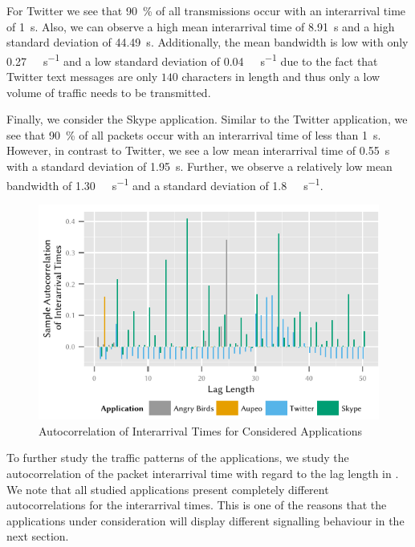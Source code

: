 For Twitter we see that \SI{90}{\percent} of all transmissions occur with an interarrival time of \SI{1}{\second}.
Also, we can observe a high mean interarrival time of \SI{8.91}{\second} and a high standard deviation of \SI{44.49}{\second}.
Additionally, the mean bandwidth is low with only \SI{0.27}{\kilo\bit\per\second} and a low standard deviation of \SI{0.04}{\kilo\bit\per\second} due to the fact that Twitter text messages are only \(140\) characters in length and thus only a low volume of traffic needs to be transmitted.

Finally, we consider the Skype application.
Similar to the Twitter application, we see that \SI{90}{\%} of all packets occur with an interarrival time of less than \SI{1}{\second}.
However, in contrast to Twitter, we see a low mean interarrival time of \SI{0.55}{\second} with a standard deviation of \SI{1.95}{\second}.
Further, we observe a relatively low mean bandwidth of \SI{1.30}{\kilo\bit\per\second} and a standard deviation of \SI{1.8}{\kilo\bit\per\second}.

\begin{figure}
\centering
\includegraphics{network/network_traces/numerical_results/figures/autocorrelation}
\caption{Autocorrelation of Interarrival Times for Considered Applications}\label{fig:network:network_traces:numerical_results:traffic:autocorrelation}
\end{figure}

To further study the traffic patterns of the applications, we study the autocorrelation of the packet interarrival time with regard to the lag length in .
We note that all studied applications present completely different autocorrelations for the interarrival times.
This is one of the reasons that the applications under consideration will display different signalling behaviour in the next section.


